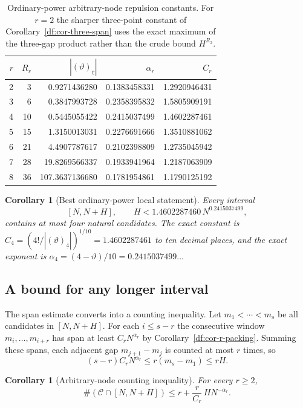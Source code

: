 \documentclass[11pt,oneside]{article}
\newtheorem{corollary}[theorem]{Corollary}
\theoremstyle{definition}
\theoremstyle{remark}
\newcommand{\thetaq}{\vartheta}
\newcommand{\Cand}{\mathcal C}
\newcommand{\fall}[2]{\left(#1\right)_{\!\underline{#2}}}
\begin{document}
\begin{table}[ht]
\centering
\small
\begin{tabular}{rrrrr}
\toprule
$r$ & $R_r$ & $|\fall{\thetaq}{r}|$ & $\alpha_r$ & $C_r$ \\
\midrule
2 & 3  & 0.9271436280 & 0.1383458331 & 1.2920946431 \\
3 & 6  & 0.3847993728 & 0.2358395832 & 1.5805909191 \\
4 & 10 & 0.5445055422 & 0.2415037499 & 1.4602287461 \\
5 & 15 & 1.3150013031 & 0.2276691666 & 1.3510881062 \\
6 & 21 & 4.4907787617 & 0.2102398809 & 1.2735045942 \\
7 & 28 & 19.8269566337 & 0.1933941964 & 1.2187063909 \\
8 & 36 & 107.3637136680 & 0.1781954861 & 1.1790125192 \\
\bottomrule
\end{tabular}
\caption{Ordinary-power arbitrary-node repulsion constants.  For $r=2$ the sharper
three-point constant of Corollary~\ref{df:cor-three-span} uses the exact maximum of the
three-gap product rather than the crude bound $H^{R_2}$.}
\label{df:tab-ordinary-constants}
\end{table}

\begin{corollary}[Best ordinary-power local statement]
\label{df:cor-four-span}
Every interval
\[
 [N,N+H],
 \qquad H<1.4602287460\,N^{0.2415037499},
\]
contains at most four natural candidates.  The exact constant is
$C_4=(4!/|\fall{\thetaq}{4}|)^{1/10}=1.4602287461$ to ten decimal places, and the exact
exponent is $\alpha_4=(4-\thetaq)/10=0.2415037499\ldots$
\end{corollary}

\subsection{A bound for any longer interval}

The span estimate converts into a counting inequality.  Let $m_1<\cdots<m_s$ be all candidates
in $[N,N+H]$.  For each $i\le s-r$ the consecutive window $m_i,\ldots,m_{i+r}$ has span at
least $C_rN^{\alpha_r}$ by Corollary~\ref{df:cor-r-packing}.  Summing these spans, each
adjacent gap $m_{j+1}-m_j$ is counted at most $r$ times, so
\[
 (s-r)C_rN^{\alpha_r}\le r(m_s-m_1)\le rH.
\]

\begin{corollary}[Arbitrary-node counting inequality]
\label{df:cor-ordinary-count}
For every $r\ge2$,
\begin{equation}
 \#(\Cand\cap[N,N+H])\le r+\frac{r}{C_r}\,HN^{-\alpha_r}.
\label{df:ordinary-count}
\end{equation}
\end{corollary}
\end{document}
